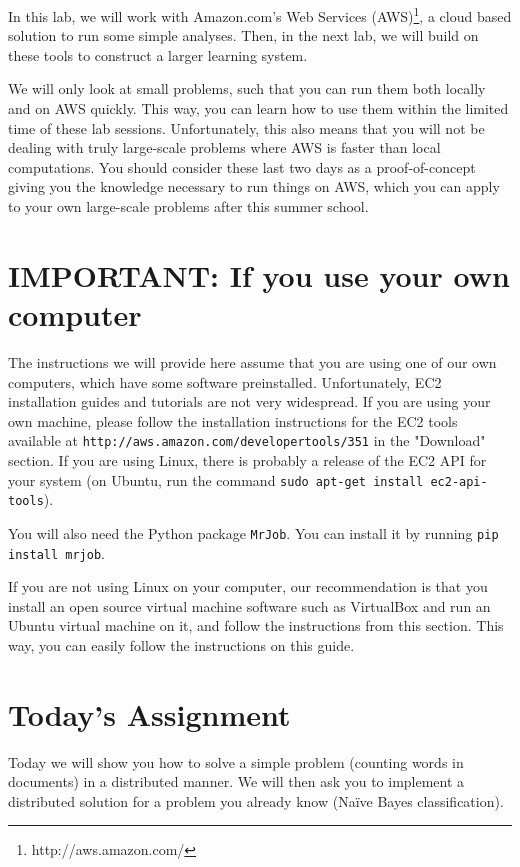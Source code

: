 In this lab, we will work with Amazon.com's Web Services (AWS)\footnote{http://aws.amazon.com/}, a cloud based solution
to run some simple analyses. Then, in the next lab, we will build on these
tools to construct a larger learning system.

We will only look at small problems, such that you can run them both locally and on AWS quickly. This way, you can learn how to use them within the limited time of these lab sessions. Unfortunately, this also means that you will not be dealing with truly large-scale problems where AWS is faster than local computations. You should consider these last two days as a proof-of-concept giving you the knowledge necessary to run things on AWS, which you can apply to your own large-scale problems after this summer school.

\section*{IMPORTANT: If you use your own computer}

The instructions we will provide here assume that you are using one of our own computers, which have some software preinstalled. Unfortunately, EC2 installation guides and tutorials are not very widespread. If you are using your own machine, please follow the installation instructions for the EC2 tools available at \texttt{http://aws.amazon.com/developertools/351} in the "Download" section. If you are using Linux, there is probably a release of the EC2 API for your system (on Ubuntu, run the command \texttt{sudo apt-get install ec2-api-tools}).

You will also need the Python package \texttt{MrJob}. You can install it by running \texttt{pip install mrjob}.

If you are not using Linux on your computer, our recommendation is that you install an open source virtual machine software such as VirtualBox and run an Ubuntu virtual machine on it, and follow the instructions from this section. This way, you can easily follow the instructions on this guide.

\section*{Today's Assignment}

Today we will show you how to solve a simple problem (counting words in
documents) in a distributed manner. We will then ask you to implement a
distributed solution for a problem you already know (Na\"{i}ve Bayes
classification).

